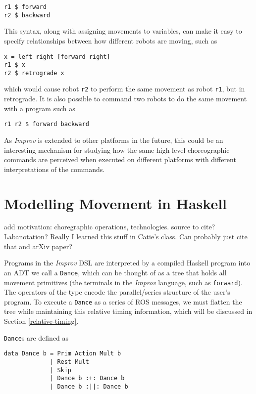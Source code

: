 \documentclass[sigconf]{acmart}
\begin{document}
\begin{verbatim}
r1 $ forward
r2 $ backward
\end{verbatim}

This syntax, along with assigning movements to variables, can make it easy to
specify relationships between how different robots are moving, such as

\begin{verbatim}
x = left right [forward right]
r1 $ x
r2 $ retrograde x
\end{verbatim}


which would cause robot \texttt{r2} to perform the same movement as
robot \texttt{r1}, but in retrograde. It is also possible to command two robots
to do the same movement with a program such as

\begin{verbatim}
r1 r2 $ forward backward
\end{verbatim}

As \emph{Improv} is extended to other platforms in the future, this could be an
interesting mechanism for studying how the same high-level choreographic
commands are perceived when executed on different platforms with different
interpretations of the commands.

\section{Modelling Movement in
Haskell}\label{modelling-movement-in-haskell}

{\color{red}add motivation: choregraphic operations, technologies. source to
cite? Labanotation? Really I learned this stuff in Catie's class. Can probably
just cite that and arXiv paper?}

Programs in the \emph{Improv} DSL are interpreted by a compiled Haskell
program into an ADT we call a \texttt{Dance}, which can be thought of as
a tree that holds all movement primitives (the terminals in the
\emph{Improv} language, such as \texttt{forward}). The operators of the
type encode the parallel/series structure of the user's program. To
execute a \texttt{Dance} as a series of ROS messages, we must flatten
the tree while maintaining this relative timing information, which will
be discussed in Section \ref{relative-timing}.

\texttt{Dance}s are defined as

\begin{verbatim}
data Dance b = Prim Action Mult b
             | Rest Mult
             | Skip
             | Dance b :+: Dance b
             | Dance b :||: Dance b
\end{verbatim}
\end{document}
